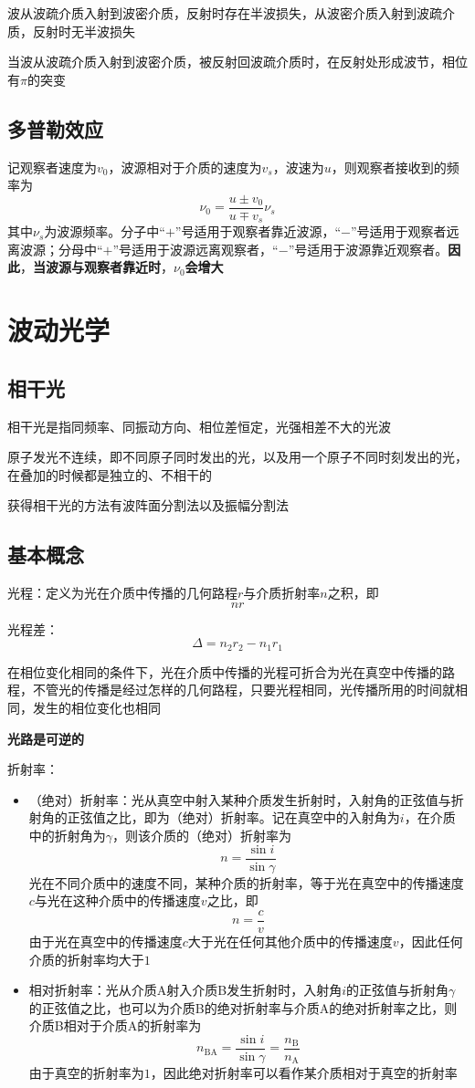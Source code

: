 \documentclass[12pt, a4paper, twoside]{ctexbook}
\begin{document}
波从波疏介质入射到波密介质，反射时存在半波损失，从波密介质入射到波疏介质，反射时无半波损失

当波从波疏介质入射到波密介质，被反射回波疏介质时，在反射处形成波节，相位有$\pi$的突变
\section{多普勒效应}
记观察者速度为$v_0$，波源相对于介质的速度为$v_s$，波速为$u$，则观察者接收到的频率为
$$
\nu_0=\frac{u\pm v_0}{u\mp v_s}\nu_s
$$
其中$\nu_s$为波源频率。分子中“$+$”号适用于观察者靠近波源，“$-$”号适用于观察者远离波源；分母中“$+$”号适用于波源远离观察者，“$-$”号适用于波源靠近观察者。\textbf{因此}，\textbf{当波源与观察者靠近时}，$\nu_0$\textbf{会增大}
\chapter{波动光学}
\newpage
\section{相干光}
相干光是指同频率、同振动方向、相位差恒定，光强相差不大的光波

原子发光不连续，即不同原子同时发出的光，以及用一个原子不同时刻发出的光，在叠加的时候都是独立的、不相干的

获得相干光的方法有波阵面分割法以及振幅分割法
\section{基本概念}
{\sonti 光程}：定义为光在介质中传播的几何路程$r$与介质折射率$n$之积，即
$$
nr
$$

{\sonti 光程差}：
$$
\Delta=n_2r_2-n_1r_1
$$

在相位变化相同的条件下，光在介质中传播的光程可折合为光在真空中传播的路程，不管光的传播是经过怎样的几何路程，只要光程相同，光传播所用的时间就相同，发生的相位变化也相同

\textbf{光路是可逆的}

{\sonti 折射率}：
\begin{itemize}
    \item （绝对）折射率：光从真空中射入某种介质发生折射时，入射角的正弦值与折射角的正弦值之比，即为（绝对）折射率。记在真空中的入射角为$i$，在介质中的折射角为$\gamma$，则该介质的（绝对）折射率为
    $$
    n=\frac{\sin i}{\sin \gamma}
    $$
    光在不同介质中的速度不同，某种介质的折射率，等于光在真空中的传播速度$c$与光在这种介质中的传播速度$v$之比，即
    $$
    n=\frac{c}{v}
    $$
    由于光在真空中的传播速度$c$大于光在任何其他介质中的传播速度$v$，因此任何介质的折射率均大于$1$
    \item 相对折射率：光从介质A射入介质B发生折射时，入射角$i$的正弦值与折射角$\gamma$的正弦值之比，也可以为介质B的绝对折射率与介质A的绝对折射率之比，则介质B相对于介质A的折射率为
    $$
    n_{\mathrm{BA}}=\frac{\sin i}{\sin \gamma}=\frac{n_\mathrm{B}}{n_\mathrm{A}}
    $$
    由于真空的折射率为$1$，因此绝对折射率可以看作某介质相对于真空的折射率
\end{itemize}
\end{document}
